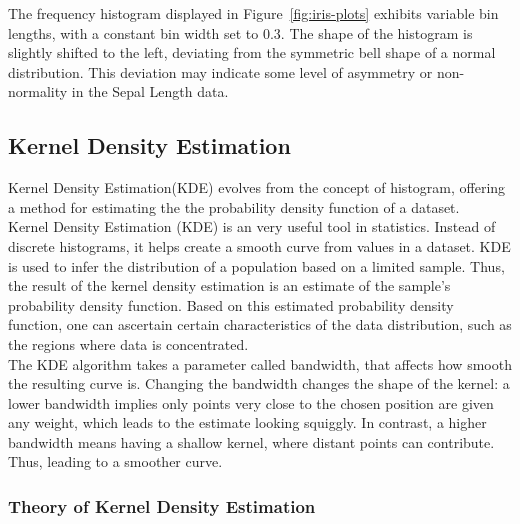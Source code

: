 \documentclass{article}\usepackage[]{graphicx}\usepackage[]{xcolor}
\numberwithin{equation}{section}
\begin{document}
\noindent The frequency histogram displayed in Figure~\ref{fig:iris-plots} exhibits variable bin lengths, with a constant bin width set to 0.3. The shape of the histogram is slightly shifted to the left, deviating from the symmetric bell shape of a normal distribution. This deviation may indicate some level of asymmetry or non-normality in the Sepal Length data. 

\subsection{Kernel Density Estimation}

Kernel Density Estimation(KDE) evolves from the concept of histogram, offering a method for estimating the the probability density function of a dataset.\\

\noindent 
Kernel Density Estimation (KDE) is an very useful tool in statistics. Instead of discrete histograms, it helps create a smooth curve from values in a dataset. KDE is used to infer the distribution of a population based on a limited sample. Thus, the result of the kernel density estimation is an estimate of the sample's probability density function. Based on this estimated probability density function, one can ascertain certain characteristics of the data distribution, such as the regions where data is concentrated.\\

\noindent
The KDE algorithm takes a parameter called bandwidth, that affects how smooth the resulting curve is. Changing the bandwidth changes the shape of the kernel: a lower bandwidth implies only points very close to the chosen position are given any weight, which leads to the estimate looking squiggly. In contrast, a higher bandwidth means having a shallow kernel, where distant points can contribute. Thus, leading to a smoother curve.

\subsubsection{Theory of Kernel Density Estimation}\\
\end{document}

